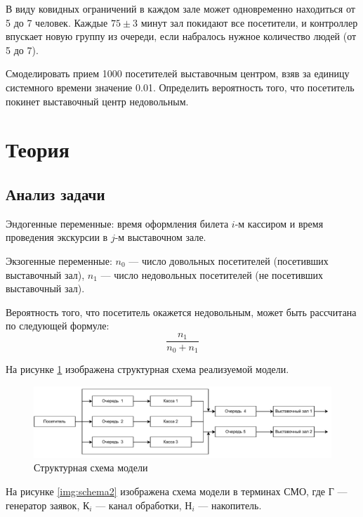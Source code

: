 \documentclass[12pt]{report}
\begin{document}
В виду ковидных ограничений в каждом зале может одновременно находиться от 5 до 7 человек. Каждые $75\pm3$ минут зал покидают все посетители, и контроллер впускает новую группу из очереди, если набралось нужное количество людей (от 5 до 7).


Смоделировать прием 1000 посетителей выставочным центром, взяв за единицу системного времени значение 0.01. Определить вероятность того, что посетитель покинет выставочный центр недовольным.

\section*{Теория}

\subsection*{Анализ задачи}
Эндогенные переменные: время оформления билета $i$-м кассиром и время проведения экскурсии в $j$-м выставочном зале.

Экзогенные переменные: $n_0$ --- число довольных посетителей (посетивших выставочный зал), $n_1$ --- число недовольных посетителей (не посетивших выставочный зал).

Вероятность того, что посетитель окажется недовольным, может быть рассчитана по следующей формуле:
\begin{equation}
    \frac{n_1}{n_0 + n_1}
\end{equation}

На рисунке \ref{img:schema1} изображена структурная схема реализуемой модели.

\begin{figure}[h!btp]
	\centering
	\includegraphics[width=1\columnwidth]{inc/schema1.pdf}
	\caption{Структурная схема модели}
	\label{img:schema1}	
\end{figure}
\clearpage

На рисунке \ref{img:schema2} изображена схема модели в терминах СМО, где $\text{Г}$ --- генератор заявок, $\text{К}_i$ --- канал обработки, $\text{Н}_i$ --- накопитель.
\end{document}
